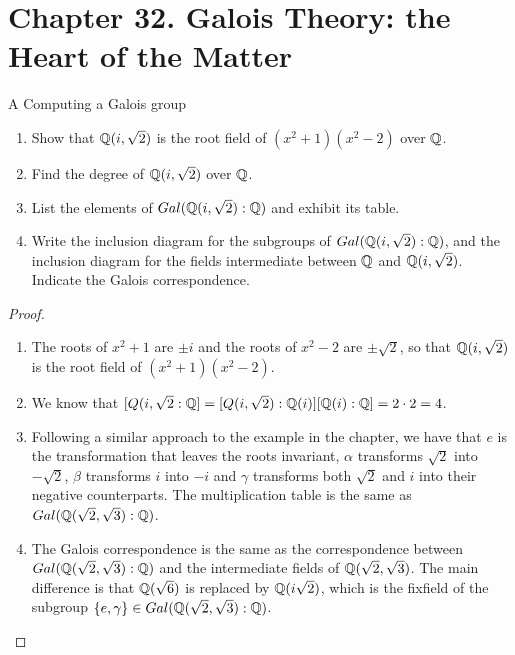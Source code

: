 \section*{Chapter 32. Galois Theory: the Heart of the Matter}


\begin{exercise}{A Computing a Galois group}
\begin{enumerate}
    \item Show that $\mathbb{Q}(i,\sqrt{2})$ is the root field of $(x^2+1)(x^2-2)$ over $\mathbb{Q}$.
    \item Find the degree of $\mathbb{Q}(i,\sqrt{2})$ over $\mathbb{Q}$.
    \item List the elements of $Gal(\mathbb{Q}(i,\sqrt{2}):\mathbb{Q})$ and exhibit its table.
    \item Write the inclusion diagram for the subgroups of $Gal(\mathbb{Q}(i,\sqrt{2}):\mathbb{Q})$, and the inclusion diagram for the fields intermediate between $\mathbb{Q}$ and $\mathbb{Q}(i,\sqrt{2})$. Indicate the Galois correspondence.
\end{enumerate}
\end{exercise}
\begin{proof}
 \begin{enumerate}
     \item The roots of $x^2+1$ are $\pm i$ and the roots of $x^2-2$ are $\pm\sqrt{2}$, so that $\mathbb{Q}(i,\sqrt{2})$ is the root field of $(x^2+1)(x^2-2)$.
     \item We know that $[Q(i,\sqrt{2}:\mathbb{Q}]=[Q(i,\sqrt{2}):\mathbb{Q}(i)][\mathbb{Q}(i):\mathbb{Q}]=2\cdot 2=4$.
     \item Following a similar approach to the example in the chapter, we have that $e$ is the transformation that leaves the roots invariant, $\alpha$ transforms $\sqrt{2}$ into $-\sqrt{2}$, $\beta$ transforms $i$ into $-i$ and $\gamma$ transforms both $\sqrt{2}$ and $i$ into their negative counterparts. The multiplication table is the same as $Gal(\mathbb{Q}(\sqrt{2},\sqrt{3}):\mathbb{Q})$.
     \item The Galois correspondence is the same as the correspondence between $Gal(\mathbb{Q}(\sqrt{2},\sqrt{3}):\mathbb{Q})$ and the intermediate fields of $\mathbb{Q}(\sqrt{2},\sqrt{3})$. The main difference is that $\mathbb{Q}(\sqrt{6})$ is replaced by $\mathbb{Q}(i\sqrt{2})$, which is the fixfield of the subgroup $\{e,\gamma\}\in Gal(\mathbb{Q}(\sqrt{2},\sqrt{3}):\mathbb{Q})$.
 \end{enumerate}
\end{proof}


